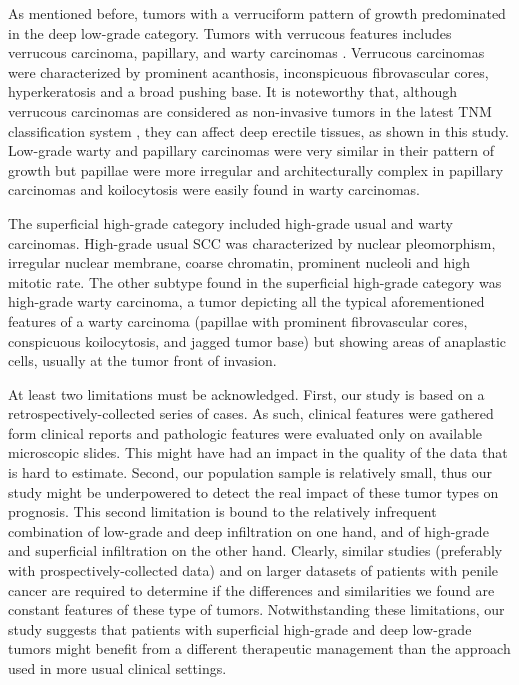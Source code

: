 \documentclass[11pt,letterpaper]{article}\usepackage[]{graphicx}\usepackage[]{color}
\begin{document}
\begin{multicols}{2}
As mentioned before, tumors with a verruciform pattern of growth predominated in the deep low-grade category. Tumors with verrucous features includes verrucous carcinoma, papillary, and warty carcinomas \cite{Chaux2010b,Chaux2012}. Verrucous carcinomas were characterized by prominent acanthosis, inconspicuous fibrovascular cores, hyperkeratosis and a broad pushing base. It is noteworthy that, although verrucous carcinomas are considered as non-invasive tumors in the latest TNM classification system \cite{Hakenberg2015}, they can affect deep erectile tissues, as shown in this study. Low-grade warty and papillary carcinomas were very similar in their pattern of growth but papillae were more irregular and architecturally complex in papillary carcinomas and koilocytosis were easily found in warty carcinomas.

The superficial high-grade category included high-grade usual and warty carcinomas. High-grade usual SCC was characterized by nuclear pleomorphism, irregular nuclear membrane, coarse chromatin, prominent nucleoli and high mitotic rate. The other subtype found in the superficial high-grade category was high-grade warty carcinoma, a tumor depicting all the typical aforementioned features of a warty carcinoma (papillae with prominent fibrovascular cores, conspicuous koilocytosis, and jagged tumor base) but showing areas of anaplastic cells, usually at the tumor front of invasion.

At least two limitations must be acknowledged. First, our study is based on a retrospectively-collected series of cases. As such, clinical features were gathered form clinical reports and pathologic features were evaluated only on available microscopic slides. This might have had an impact in the quality of the data that is hard to estimate. Second, our population sample is relatively small, thus our study might be underpowered to detect the real impact of these tumor types on prognosis. This second limitation is bound to the relatively infrequent combination of low-grade and deep infiltration on one hand, and of high-grade and superficial infiltration on the other hand. Clearly, similar studies (preferably with prospectively-collected data) and on larger datasets of patients with penile cancer are required to determine if the differences and similarities we found are constant features of these type of tumors. Notwithstanding these limitations, our study suggests that patients with superficial high-grade and deep low-grade tumors might benefit from a different therapeutic management than the approach used in more usual clinical settings.


\end{multicols}
\end{document}
